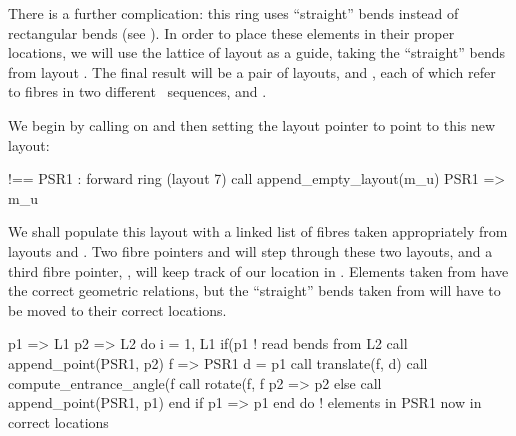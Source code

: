 There is a further complication: this ring uses ``straight'' bends
instead of rectangular bends (see ). In order to
place these elements in their proper locations, we will use the
lattice of layout  as a guide, taking the ``straight''
bends from layout .%
The final result will be a pair of layouts,  and
, each of which refer to fibres in two different
\DNA\ sequences,  and .

%
We begin by calling  on  and then
setting the layout pointer  to point to this new layout:
%
\begin{ptccode}
!== PSR1 : forward ring  (layout 7)
call append_empty_layout(m_u)
PSR1 => m_u%
\end{ptccode}
%
We shall populate this layout with a linked list of fibres taken
appropriately from layouts  and . Two fibre
pointers  and  will step through these two layouts,
and a third fibre pointer, , will keep track of our location
in . Elements taken from  have the correct
geometric relations, but the ``straight'' bends taken from 
will have to be moved to their correct locations.

\begin{ptccode}
p1 => L1%
p2 => L2%
do i = 1, L1%
  if(p1%
    ! read bends from L2
    call append_point(PSR1, p2)    \label{lin:psr1.append.L2}
    f => PSR1%
    d = p1%
    call translate(f, d)           \label{lin:psr1.trans.d}
    call compute_entrance_angle(f%
    call rotate(f, f%
    p2 => p2%
  else
    call append_point(PSR1, p1)    \label{lin:psr1.append.L1}
  end if
  p1 => p1%
end do ! elements in PSR1 now in correct locations
\end{ptccode}


